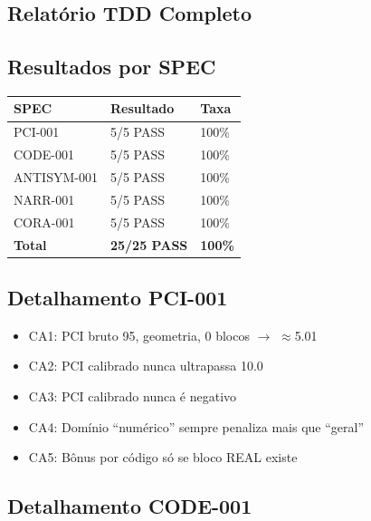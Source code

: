 \documentclass[12pt,a4paper,sumario=tradicional]{abntex2}
\begin{document}
\begin{apendicesenv}

\chapter{Relatório TDD Completo}

\section{Resultados por SPEC}

\begin{longtable}{@{}lll@{}}
\toprule
\textbf{SPEC} & \textbf{Resultado} & \textbf{Taxa} \\
\midrule
PCI-001 & 5/5 PASS & 100\% \\
CODE-001 & 5/5 PASS & 100\% \\
ANTISYM-001 & 5/5 PASS & 100\% \\
NARR-001 & 5/5 PASS & 100\% \\
CORA-001 & 5/5 PASS & 100\% \\
\midrule
\textbf{Total} & \textbf{25/25 PASS} & \textbf{100\%} \\
\bottomrule
\end{longtable}

\section{Detalhamento PCI-001}

\begin{itemize}
    \item [+] CA1: PCI bruto 95, geometria, 0 blocos $\to$ $\approx$5.01
    \item [+] CA2: PCI calibrado nunca ultrapassa 10.0
    \item [+] CA3: PCI calibrado nunca é negativo
    \item [+] CA4: Domínio ``numérico'' sempre penaliza mais que ``geral''
    \item [+] CA5: Bônus por código só se bloco REAL existe
\end{itemize}

\section{Detalhamento CODE-001}


\end{apendicesenv}
\end{document}
